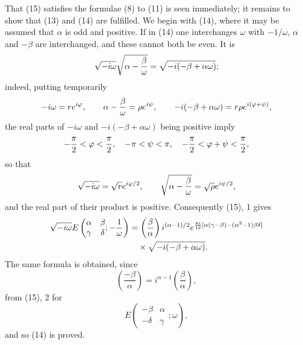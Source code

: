 \documentclass[11pt]{article}
\newcommand{\Jac}[2]{\left(\frac{#1}{#2}\right)}
\begin{document}
That (15) satisfies the formulae (8) to (11) is seen immediately; it remains to show that (13) and (14) are fulfilled. We begin with (14), where it may be assumed that $\alpha$ is odd and positive. If in (14) one interchanges $\omega$ with $-1/\omega$, $\alpha$ and $-\beta$ are interchanged, and these cannot both be even. It is
\[
\sqrt{-i\omega}\sqrt{\alpha-{\beta\over\omega}}=
\sqrt{-i(-\beta+\alpha\omega)};
\]
indeed, putting temporarily
\[
-i\omega=re^{i\varphi},
\qquad
\alpha-{\beta\over\omega}=\rho e^{i\psi},
\qquad
-i(-\beta+\alpha\omega)=r\rho e^{i(\varphi+\psi)},
\]
the real parts of $-i\omega$ and $-i(-\beta+\alpha\omega)$ being positive imply
\[
-{\pi\over2}<\varphi<{\pi\over2},
\quad -\pi<\psi<\pi,
\quad -{\pi\over2}<\varphi+\psi<{\pi\over2},
\]
so that
\[
\sqrt{-i\omega}=\sqrt r e^{i\varphi/2},
\qquad
\sqrt{\alpha-{\beta\over\omega}}=\sqrt\rho e^{i\psi/2},
\]
and the real part of their product is positive. Consequently (15), 1 gives
\begin{align*}
\sqrt{-i\omega}
E\left(\begin{matrix}\alpha&\beta\\ \gamma&\delta\end{matrix};-{1\over\omega}\right)
&=\Jac{\beta}{\alpha} i^{(\alpha-1)/2}
 e^{{\pi i\over12}[\alpha(\gamma-\beta)-(\alpha^2-1)\beta\delta]}\\
&\quad\times\sqrt{-i(-\beta+\alpha\omega)}.
\end{align*}
The same formula is obtained, since
\[
\Jac{-\beta}{\alpha}=i^{\alpha-1}\Jac{\beta}{\alpha},
\]
from (15), 2 for
\[
E\left(\begin{matrix}-\beta&\alpha\\ -\delta&\gamma\end{matrix};\omega\right),
\]
and so (14) is proved.
\end{document}
